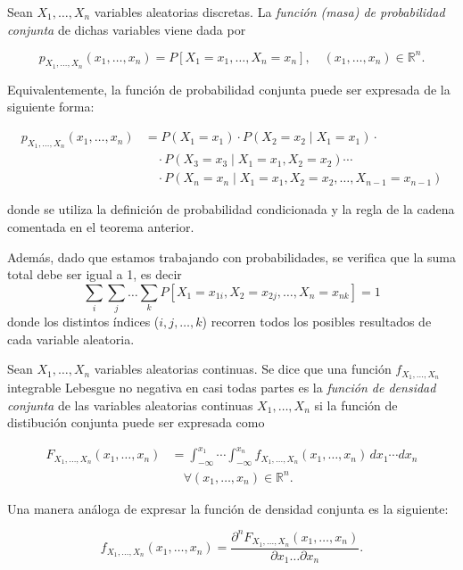 \begin{definicion}
    Sean $X_1, \ldots, X_n$ variables aleatorias discretas. La \emph{función (masa) de probabilidad conjunta} de dichas variables viene dada por

    \[ p_{X_1, \ldots, X_n}(x_1, \ldots, x_n) = P[X_1 = x_1, \ldots, X_n = x_n], \quad (x_1, \ldots, x_n) \in \mathbb{R}^n. \]

    Equivalentemente, la función de probabilidad conjunta puede ser expresada de la siguiente forma:

    \begin{align*}
        p_{X_1, \dots, X_n}(x_1, \dots, x_n) &= P(X_1 = x_1) \cdot P(X_2 = x_2 \mid X_1 = x_1) \cdot \\
        &\quad \cdot P(X_3 = x_3 \mid X_1 = x_1, X_2 = x_2) \cdots \\
        &\quad \cdot P(X_n = x_n \mid X_1 = x_1, X_2 = x_2, \dots, X_{n-1} = x_{n-1})
    \end{align*}

    donde se utiliza la definición de probabilidad condicionada y la regla de la cadena comentada en el teorema anterior.
\end{definicion}

Además, dado que estamos trabajando con probabilidades, se verifica que la suma total debe ser igual a 1, es decir 
\[ \sum_{i}\sum_{j}\ldots\sum_{k}P[X_1=x_{1i}, X_2=x_{2j}, \ldots, X_n=x_{nk}] = 1 \] 
donde los distintos índices ($i, j, \ldots, k$) recorren todos los posibles resultados de cada variable aleatoria.

\begin{definicion}
    Sean $X_1, \ldots, X_n$ variables aleatorias continuas. Se dice que una función $f_{X_{1}, \ldots, X_n}$ integrable Lebesgue no negativa en casi todas partes es la \emph{función de densidad conjunta} de las variables aleatorias continuas $X_1, \ldots, X_n$ si la función de distibución conjunta puede ser expresada como

    \begin{align*}
        F_{X_{1}, \ldots, X_{n}}(x_1, \ldots, x_n) &=  
        \int_{-\infty}^{x_1} \cdots \int_{-\infty}^{x_n} 
        f_{X_{1}, \ldots, X_n}(x_1, \ldots, x_n) \, dx_1 \cdots dx_n \\
        &\quad \forall(x_1, \ldots, x_n) \in \mathbb{R}^n.
    \end{align*}

    Una manera análoga de expresar la función de densidad conjunta es la siguiente:

    \[ f_{X_{1}, \ldots, X_n} (x_1, \ldots, x_n) = \frac{\partial^{n}F_{X_{1}, \ldots, X_{n}}(x_1, \ldots, x_n)}{\partial x_1 \ldots \partial x_n}. \]
\end{definicion}

